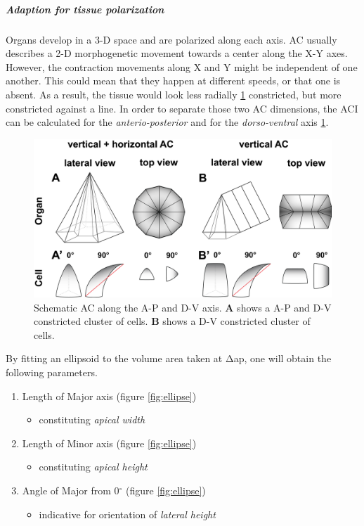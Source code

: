 \documentclass[11pt,singlespacinge,twoside]{reedthesis} %
\providecommand{\tightlist}{%
  \setlength{\itemsep}{0pt}\setlength{\parskip}{0pt}}
\begin{document}
\hypertarget{ACI-pol}{%
\subparagraph{Adaption for tissue polarization}\label{ACI-pol}}

Organs develop in a 3-D space and are polarized along each axis. AC usually describes a 2-D morphogenetic movement towards a center along the X-Y axes. However, the contraction movements along X and Y might be independent of one another. This could mean that they happen at different speeds, or that one is absent. As a result, the tissue would look less radially \ref{fig:cellpol} constricted, but more constricted against a line. In order to separate those two AC dimensions, the ACI can be calculated for the \emph{anterio-posterior} and for the \emph{dorso-ventral} axis \ref{fig:cellpol}.


\begin{figure}

{\centering \includegraphics[width=0.75\linewidth]{figure/02-MaMo/ACI/ACI_Cells_pol} 

}

\caption[Schematic anisotropic AC]{Schematic AC along the A-P and D-V axis. \textbf{A} shows a A-P and D-V constricted cluster of cells. \textbf{B} shows a D-V constricted cluster of cells.}\label{fig:cellpol}
\end{figure}
\noindent By fitting an ellipsoid to the volume area taken at \(\mathrm{\Delta}\)ap, one will obtain the following parameters.
\begin{enumerate}
\def\labelenumi{\arabic{enumi}.}
\tightlist
\item
  Length of Major axis (figure \ref{fig:ellipse})
  \begin{itemize}
  \tightlist
  \item
    constituting \emph{apical width}
  \end{itemize}
\item
  Length of Minor axis (figure \ref{fig:ellipse})
  \begin{itemize}
  \tightlist
  \item
    constituting \emph{apical height}
  \end{itemize}
\item
  Angle of Major from 0\(^\circ\) (figure \ref{fig:ellipse})
  \begin{itemize}
  \tightlist
  \item
    indicative for orientation of \emph{lateral height}
  \end{itemize}
\end{enumerate}
\end{document}
